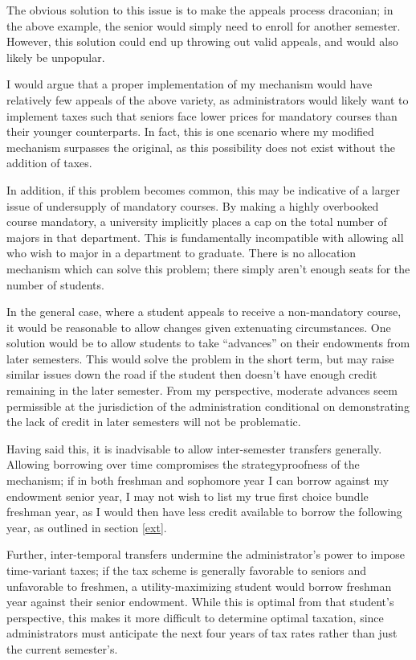 \documentclass{article}
\begin{document}
The obvious solution to this issue is to make the appeals process draconian; in the above example, the senior would simply need to enroll for another semester. However, this solution could end up throwing out valid appeals, and would also likely be unpopular. 

I would argue that a proper implementation of my mechanism would have relatively few appeals of the above variety, as administrators would likely want to implement taxes such that seniors face lower prices for mandatory courses than their younger counterparts. In fact, this is one scenario where my modified mechanism surpasses the original, as this possibility does not exist without the addition of taxes.

In addition, if this problem becomes common, this may be indicative of a larger issue of undersupply of mandatory courses. By making a highly overbooked course mandatory, a university implicitly places a cap on the total number of majors in that department. This is fundamentally incompatible with allowing all who wish to major in a department to graduate. There is no allocation mechanism which can solve this problem; there simply aren't enough seats for the number of students. 

In the general case, where a student appeals to receive a non-mandatory course, it would be reasonable to allow changes given extenuating circumstances. One solution would be to allow students to take ``advances'' on their endowments from later semesters. This would solve the problem in the short term, but may raise similar issues down the road if the student then doesn't have enough credit remaining in the later semester. From my perspective, moderate advances seem permissible at the jurisdiction of the administration conditional on demonstrating the lack of credit in later semesters will not be problematic. 

Having said this, it is inadvisable to allow inter-semester transfers generally. Allowing borrowing over time compromises the strategyproofness of the mechanism; if in both freshman and sophomore year I can borrow against my endowment senior year, I may not wish to list my true first choice bundle freshman year, as I would then have less credit available to borrow the following year, as outlined in section \ref{ext}. 

Further, inter-temporal transfers undermine the administrator's power to impose time-variant taxes; if the tax scheme is generally favorable to seniors and unfavorable to freshmen, a utility-maximizing student would borrow freshman year against their senior endowment. While this is optimal from that student's perspective, this makes it more difficult to determine optimal taxation, since administrators must anticipate the next four years of tax rates rather than just the current semester's. 
\end{document}
